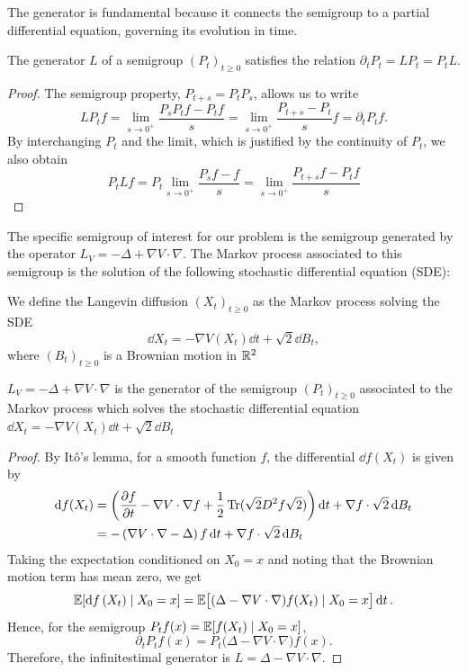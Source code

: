 The generator is fundamental because it connects the semigroup to a partial differential equation, governing its evolution in time.

\begin{proposition} \label{prop:partial_P}
    The generator $L$ of a semigroup $(P_t)_{t \ge 0}$ satisfies the relation $\partial_t P_t = LP_t = P_t L$.
\end{proposition}
\begin{proof}
    The semigroup property, $P_{t+s} = P_t P_s$, allows us to write
    $$
    L P_t f 
    = \lim_{s \to 0^+} \frac{P_s P_t f - P_t f}{s}
    = \lim_{s \to 0^+} \frac{P_{t+s} - P_t}{s} f = \partial_t P_t f.
    $$
    By interchanging $P_t$ and the limit, which is justified by the continuity of $P_t$, we also obtain
    $$
    P_t L f 
    = P_t \lim_{s \to 0^+} \frac{P_s f - f}{s}
    = \lim_{s \to 0^+} \frac{P_{t+s} f - P_t f}{s}
    $$
\end{proof}

The specific semigroup of interest for our problem is the semigroup generated by the operator $L_V = -\Delta + \nabla V \cdot \nabla$.  The Markov process associated to this semigroup is the solution of the following stochastic differential equation (SDE):

\begin{definition} \label{def:langevin_process}
    We define the Langevin diffusion $(X_t)_{t \ge 0}$ as the Markov process solving the SDE
    $$
    \dd{X_t} = - \nabla V(X_t) \dd{t} + \sqrt{2} \dd{B_t},
    $$
    where $(B_t)_{t \ge 0}$ is a Brownian motion in $\mathbb{R}^2$
\end{definition}


\begin{proposition}
    $L_V = - \Delta + \nabla V \cdot \nabla$ is the generator of the semigroup $(P_t)_{t \ge 0}$ associated to the Markov process which solves the stochastic differential equation $\dd{X_t} = - \nabla V(X_t) \dd{t} + \sqrt{2} \dd{B_t}$
\end{proposition}
\begin{proof}
    By Itô's lemma, for a smooth function $f$, the differential $\dd{f}(X_t)$ is given by
    \begin{align*}
    \dd{f(X_t)} &= \left( \pdv{f}{t} - \nabla V \cdot \nabla f + \frac{1}{2} \operatorname{Tr}(\sqrt{2} D^2 f \sqrt{2}) \right)\dd{t} + \nabla f \cdot \sqrt{2}\dd{B_t} \\
    &= -\left(\nabla V \cdot \nabla -  \Delta \right) f \dd{t} + \nabla f \cdot \sqrt{2}\dd{B_t}
    \end{align*}
    Taking the expectation conditioned on $X_0=x$ and noting that the Brownian motion term has mean zero, we get
    \[
    \mathbb{E}[\dd{f}(X_t)\mid X_0=x]
    = \mathbb{E}\big[(\Delta - \nabla V \cdot \nabla)f(X_t)\mid X_0=x\big]\dd{t}.
    \]
    Hence, for the semigroup $P_t f(x)=\mathbb{E}[f(X_t)\mid X_0=x]$,
    \[
    \partial_t P_t f(x) = P_t\big(\Delta - \nabla V \cdot \nabla\big)f(x).
    \]
    Therefore, the infinitestimal generator is $L=\Delta-\nabla V\cdot\nabla$.
\end{proof}

